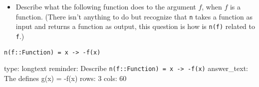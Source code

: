 \documentclass[12pt]{article}
\begin{document}
\begin{itemize}
\itemsep1pt\parskip0pt
\item
  Describe what the following function does to the argument $f$, when
  $f$ is a function. (There isn't anything to do but recognize that
  \texttt{n} takes a function as input and returns a function as output,
  this question is how is \texttt{n(f)} related to \texttt{f}.)
\end{itemize}



\begin{verbatim}
n(f::Function) = x -> -f(x)
\end{verbatim}
\begin{answer}
type: longtext
reminder: Describe \verb+n(f::Function) = x -> -f(x)+
answer_text: The defines g(x) = -f(x) 
rows: 3
cols: 60
\end{answer}
\end{document}
